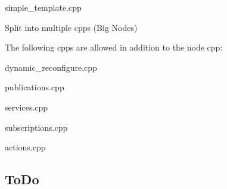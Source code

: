 \begin{DoxyEnumerate}
\begin{DoxyEnumerate}
\begin{DoxyItemize}
\begin{DoxyItemize}
\begin{DoxyItemize}
\item simple\+\_\+template.\+cpp
\end{DoxyItemize}
\end{DoxyItemize}
\item Split into multiple cpps (Big Nodes)
\begin{DoxyItemize}
\item The following cpps are allowed in addition to the node cpp\+:
\begin{DoxyItemize}
\item dynamic\+\_\+reconfigure.\+cpp
\item publications.\+cpp
\item services.\+cpp
\item subscriptions.\+cpp
\item actions.\+cpp 


\end{DoxyItemize}
\end{DoxyItemize}
\end{DoxyItemize}
\end{DoxyEnumerate}
\end{DoxyEnumerate}

\subsection*{To\+Do}


